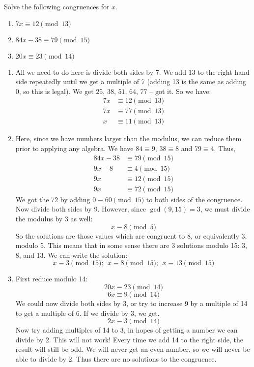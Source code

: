 \documentclass[12pt]{article}
\begin{document}
\begin{example}
	Solve the following congruences for $x$.
	\begin{enumerate}
		\item $7x \equiv 12 \pmod{13}$
		\item $84x - 38 \equiv 79 \pmod{15}$
		\item $20x \equiv 23 \pmod{14}$
	\end{enumerate}
	\begin{solution}
		\begin{enumerate}
		\item All we need to do here is divide both sides by 7.  We add 13 to the right hand side repeatedly until we get a multiple of 7 (adding 13 is the same as adding 0, so this is legal).  We get $25$, $38$, $51$, $64$, $77$ -- got it.  So we have:
		\[\begin{aligned}
			7x & \equiv 12 \pmod{13} \\
			7x & \equiv 77 \pmod{13} \\
			x & \equiv 11 \pmod{13}
		\end{aligned} \]
		
		\item Here, since we have numbers larger than the modulus, we can reduce them prior to applying any algebra.  We have $84 \equiv 9$, $38 \equiv 8$ and $79 \equiv 4$.  Thus,
		\[\begin{aligned}
		84x - 38 & \equiv 79 \pmod{15} \\
		9x - 8 & \equiv 4 \pmod{15} \\
		9x & \equiv 12 \pmod{15} \\
		9x & \equiv 72 \pmod{15}
		\end{aligned}\]
		We got the 72 by adding $0 \equiv 60 \pmod{15}$ to both sides of the congruence.  Now divide both sides by 9.  However, since $\gcd(9, 15) = 3$, we must divide the modulus by 3 as well:
		\[x \equiv 8 \pmod 5\]
		So the solutions are those values which are congruent to 8, or equivalently 3, modulo 5.  This means that in some sense there are 3 solutions modulo 15: 3, 8, and 13.  We can write the solution:
		\[x \equiv 3 \pmod{15}; ~~ x \equiv 8 \pmod{15}; ~~x \equiv 13 \pmod{15}\]
		
		\item First reduce modulo 14:
		\[20x \equiv 23 \pmod{14}\]
		\[6x \equiv 9 \pmod{14}\]
		We could now divide both sides by 3, or try to increase 9 by a multiple of 14 to get a multiple of 6.  If we divide by 3, we get,
		\[2x \equiv 3 \pmod{14}\]
		Now try adding multiples of 14 to 3, in hopes of getting a number we can divide by 2.  This will not work!  Every time we add 14 to the right side, the result will still be odd.  We will never get an even number, so we will never be able to divide by 2.  Thus there are no solutions to the congruence.
		\end{enumerate}
	\end{solution}
\end{example}
\end{document}
